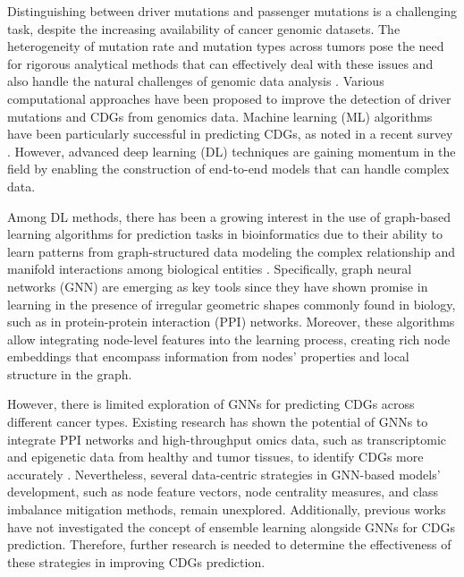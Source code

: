 Distinguishing between driver mutations and passenger mutations is a challenging task, despite the increasing availability of cancer genomic datasets. The heterogeneity of mutation rate and mutation types across tumors pose the need for rigorous analytical methods that can effectively deal with these issues and also handle the natural challenges of genomic data analysis  \cite{martinez2020compendium}. Various computational approaches have been proposed to improve the detection of driver mutations and CDGs from genomics data. Machine learning (ML) algorithms have been particularly successful in predicting CDGs, as noted in a recent survey \cite{andrades2022machine}. However, advanced deep learning (DL) techniques are gaining momentum in the field by enabling the construction of end-to-end models that can handle complex data. 

Among DL methods, there has been a growing interest in the use of graph-based learning algorithms for prediction tasks in bioinformatics due to their ability to learn patterns from graph-structured data modeling the complex relationship and manifold interactions among biological entities \cite{georgousis2021graph}. Specifically, graph neural networks (GNN) are emerging as key tools since they have shown promise in learning in the presence of irregular geometric shapes commonly found in biology, such as in protein-protein interaction (PPI) networks. Moreover, these algorithms allow integrating node-level features into the learning process, creating rich node embeddings that encompass information from nodes' properties and local structure in the graph.


However, there is limited exploration of GNNs for predicting CDGs across different cancer types. Existing research has shown the potential of GNNs to integrate PPI networks and high-throughput omics data, such as transcriptomic and epigenetic data from healthy and tumor tissues, to identify CDGs more accurately \cite{Schulte-Sasse2019, schulte2021integration}. Nevertheless, several data-centric strategies in GNN-based models' development, such as node feature vectors, node centrality measures, and class imbalance mitigation methods, remain unexplored. Additionally, previous works have not investigated the concept of ensemble learning alongside GNNs for CDGs prediction. Therefore, further research is needed to determine the effectiveness of these strategies in improving CDGs prediction.

